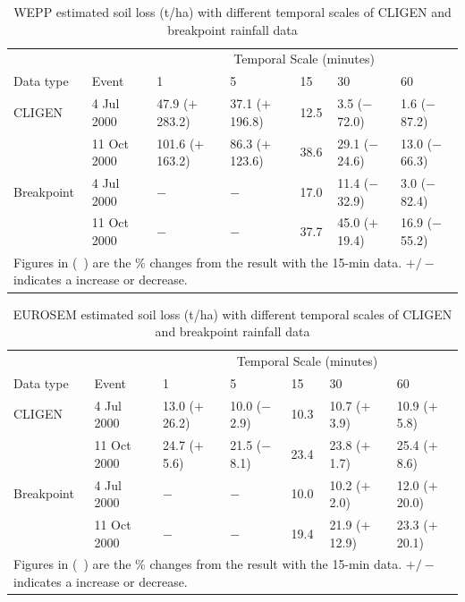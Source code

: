 \begin{table}[htbp]
  \centering
  \footnotesize
  \caption[WEPP estimated soil loss with different temporal scales of CLIGEN and
breakpoint rainfall data]{WEPP estimated soil loss (t/ha) with different
temporal scales of CLIGEN and breakpoint rainfall data}
  \label{tab:DifferentTemporalScalesOfRainfallDataOnWEPPSoilLossEstimation}
    \begin{tabular}{lllllll}
    \toprule
    & & \multicolumn{5}{c}{Temporal Scale (minutes)}\\
      \cmidrule{3-7}
    Data type & Event & 1 & 5 & 15 & 30 & 60 \\
    \midrule
    CLIGEN & 4 Jul 2000 & 47.9 ($+$283.2) & 37.1 ($+$196.8) & 12.5 & 3.5
($-$72.0) & 1.6 ($-$87.2) \\
     & 11 Oct 2000 & 101.6 ($+$163.2) & 86.3 ($+$123.6) & 38.6 & 29.1 ($-$24.6)
& 13.0 ($-$66.3) \\
     \midrule
    Breakpoint & 4 Jul 2000 & $-$ & $-$ & 17.0 & 11.4 ($-$32.9) & 3.0 ($-$82.4)
\\
     & 11 Oct 2000 & $-$ & $-$ & 37.7 & 45.0 ($+$19.4) & 16.9 ($-$55.2) \\
    \bottomrule
    \multicolumn{7}{p{13cm}}{\footnotesize Figures in (\ ) are the \% changes
from the result with the 15-min data. $+/-$ indicates a increase or decrease.}\\
    \end{tabular}
\end{table}

\begin{table}[htbp]
  \centering
  \footnotesize
  \caption[EUROSEM estimated soil loss with different temporal scales of CLIGEN
and breakpoint rainfall data]{EUROSEM estimated soil loss (t/ha) with different
temporal scales of CLIGEN and breakpoint rainfall data}
  \label{tab:DifferentTemporalScalesOfRainfallDataOnEUROSEMSoilLoss}
    \begin{tabular}{lllllll}
    \toprule
    & & \multicolumn{5}{c}{Temporal Scale (minutes)}\\
      \cmidrule{3-7}
    Data type & Event & 1 & 5 & 15 & 30 & 60 \\
    \midrule
    CLIGEN & 4 Jul 2000 & 13.0 ($+$26.2) & 10.0 ($-$2.9) & 10.3 & 10.7 ($+$3.9)
& 10.9 ($+$5.8) \\
     & 11 Oct 2000 & 24.7 ($+$5.6) & 21.5 ($-$8.1) & 23.4 & 23.8 ($+$1.7) & 25.4
($+$8.6) \\
     \midrule
    Breakpoint & 4 Jul 2000 & $-$ & $-$ & 10.0 & 10.2 ($+$2.0) & 12.0 ($+$20.0)
\\
     & 11 Oct 2000 & $-$ & $-$ & 19.4 & 21.9 ($+$12.9) & 23.3 ($+$20.1) \\
    \bottomrule
    \multicolumn{7}{p{12cm}}{\footnotesize Figures in (\ ) are the \% changes
from the result with the 15-min data. $+/-$ indicates a increase or decrease.}\\
    \end{tabular}
\end{table}

